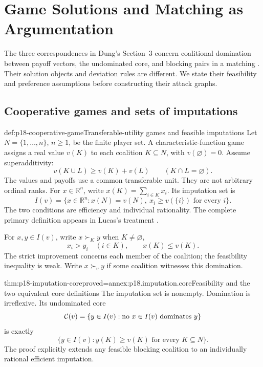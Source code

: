 \chapter{Game Solutions and Matching as Argumentation}
\label{sec:p18-game-argumentation}

The three correspondences in Dung's Section~3 concern
coalitional domination between payoff vectors, the
undominated core, and blocking pairs in a matching
\cite[pp.~334--338]{Dung1995}. Their solution objects
and deviation rules are different. We state their
feasibility and preference assumptions before
constructing their attack graphs.

\section{Cooperative games and sets of imputations}

\begin{hbdefinition}{def:p18-cooperative-game}{Transferable-utility games and feasible imputations}
Let \(N=\{1,\ldots,n\}\), \(n\geq1\), be the
finite player set. A characteristic-function
game assigns a real value \(v(K)\) to each
coalition \(K\subseteq N\), with
\(v(\varnothing)=0\). Assume superadditivity:
\[
       v(K\cup L)\geq v(K)+v(L)\qquad(K\cap L=\varnothing).
\]
The values and payoffs use a common transferable
unit. They are not arbitrary ordinal ranks.
For \(x\in\mathbb R^n\), write
\(x(K)=\sum_{i\in K}x_i\). Its imputation set is
\[
 I(v)=\{x\in\mathbb R^n:x(N)=v(N),\
                                  x_i\geq v(\{i\})\text{ for every }i\}.
\]
The two conditions are efficiency and individual
rationality. The complete primary definition
appears in Lucas's treatment
\cite[sec.~2, pp.~1--2]{Lucas1968NoSolutionProof}.

For \(x,y\in I(v)\), write \(x\succ_K y\)
when \(K\ne\varnothing\),
\[
            x_i>y_i\quad(i\in K),\qquad x(K)\leq v(K).
\]
The strict improvement concerns each member
of the coalition; the feasibility inequality
is weak. Write \(x\succ_v y\) if some
coalition witnesses this domination.
\end{hbdefinition}

\begin{hblemma}{thm:p18-imputation-core}{proved=annex:p18.imputation.core}{Feasibility and the two equivalent core definitions}
The imputation set is nonempty. Domination
is irreflexive. Its undominated core
\[
 {\cal C}(v)=\{y\in I(v):\text{no }x\in I(v)\text{ dominates }y\}
\]
is exactly
\[
              \{y\in I(v):y(K)\geq v(K)\text{ for every }K\subseteq N\}.
\]
The proof explicitly extends any feasible
blocking coalition to an individually
rational efficient imputation.
\end{hblemma}

